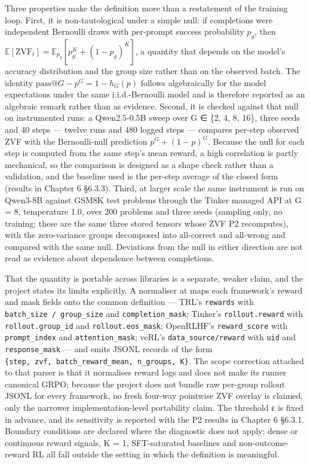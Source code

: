 \documentclass[12pt,a4paper]{report}
\DeclareRobustCommand{\longtok}[1]{\texttt{\seqsplit{#1}}}
\begin{document}
Three properties make the definition more than a restatement of the
training loop. First, it is non-tautological under a simple null: if
completions were independent Bernoulli draws with per-prompt success
probability \(p_g\), then
\(\mathbb{E}[\mathrm{ZVF}_t] = \mathbb{E}_{p_g}[p_g^K + (1-p_g)^K]\), a
quantity that depends on the model's accuracy distribution and the group
size rather than on the observed batch. The identity
\(\mathrm{pass@}G - p^G = 1 - h_G(p)\) follows algebraically for the
model expectations under the same i.i.d.-Bernoulli model and is
therefore reported as an algebraic remark rather than as evidence.
Second, it is checked against that null on instrumented runs: a
Qwen2.5-0.5B sweep over G ∈ \{2, 4, 8, 16\}, three seeds and 40 steps
--- twelve runs and 480 logged steps --- compares per-step observed ZVF
with the Bernoulli-null prediction \(p^G + (1-p)^G\). Because the null
for each step is computed from the same step's mean reward, a high
correlation is partly mechanical, so the comparison is designed as a
shape check rather than a validation, and the baseline used is the
per-step average of the closed form (results in Chapter 6 §6.3.3).
Third, at larger scale the same instrument is run on Qwen3-8B against
GSM8K test problems through the Tinker managed API at G = 8, temperature
1.0, over 200 problems and three seeds (sampling only, no training;
these are the same three stored tensors whose ZVF P2 recomputes), with
the zero-variance groups decomposed into all-correct and all-wrong and
compared with the same null. Deviations from the null in either
direction are not read as evidence about dependence between completions.

That the quantity is portable across libraries is a separate, weaker
claim, and the project states its limits explicitly. A normaliser at
\longtok{platform\_modal/scripts/zvf\_\allowbreak{}compute\_\allowbreak{}cross\_\allowbreak{}framework.py} maps
each framework's reward and mask fields onto the common definition ---
TRL's \texttt{rewards} with \texttt{batch\_size\ /\ group\_size} and
\texttt{completion\_mask}; Tinker's \texttt{rollout.reward} with
\texttt{rollout.group\_id} and \texttt{rollout.eos\_mask}; OpenRLHF's
\texttt{reward\_score} with \texttt{prompt\_index} and
\texttt{attention\_mask}; veRL's \texttt{data\_source/reward} with
\texttt{uid} and \texttt{response\_mask} --- and emits JSONL records of
the form \texttt{\{step,\allowbreak{}\ zvf,\allowbreak{}\ batch\_\allowbreak{}\allowbreak{}reward\_\allowbreak{}\allowbreak{}mean,\allowbreak{}\ n\_\allowbreak{}groups,\allowbreak{}\ K\}}.
The scope correction attached to that parser is that it normalises
reward logs and does not make its runner canonical GRPO; because the
project does not bundle raw per-group rollout JSONL for every framework,
no fresh four-way pointwise ZVF overlay is claimed, only the narrower
implementation-level portability claim. The threshold ε is fixed in
advance, and its sensitivity is reported with the P2 results in Chapter
6 §6.3.1. Boundary conditions are declared where the diagnostic does not
apply: dense or continuous reward signals, K = 1, SFT-saturated
baselines and non-outcome-reward RL all fall outside the setting in
which the definition is meaningful.
\end{document}
